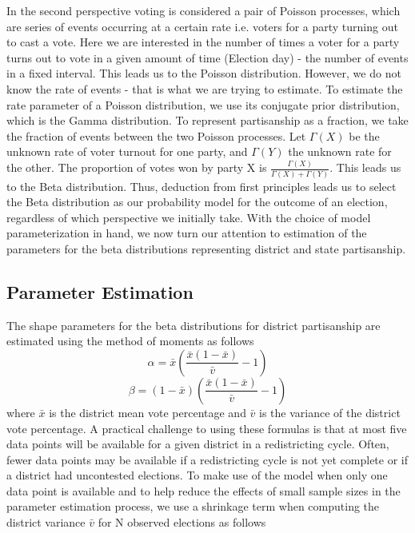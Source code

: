 \documentclass[preprint,12pt]{article}
\begin{document}
In the second perspective voting is considered a pair of Poisson processes, which are series of events occurring at a certain rate i.e. voters for a party turning out to cast a vote. 
Here we are interested in the number of times a voter for a party turns out to vote in a given amount of time (Election day) - the number of events in a fixed interval. 
This leads us to the Poisson distribution.  
However, we do not know the rate of events - that is what we are trying to estimate.  
To estimate the rate parameter of a Poisson distribution, we use its conjugate prior distribution, which is the Gamma distribution. 
To represent partisanship as a fraction, we take the fraction of events between the two Poisson processes.  
Let $\Gamma\left(X\right)$ be the unknown rate of voter turnout for one party, and $\Gamma\left(Y\right)$ the unknown rate for the other.
The proportion of votes won by party X is $\frac{\Gamma\left(X\right)}{\Gamma\left(X\right)+\Gamma\left(Y\right)} $. 
This leads us to the Beta distribution.
Thus, deduction from first principles leads us to select the Beta distribution as our probability model for the outcome of an election, regardless of which perspective we initially take.
With the choice of model parameterization in hand, we now turn our attention to estimation of the parameters for the beta distributions representing district and state partisanship.

\subsection{Parameter Estimation}
The shape parameters for the beta distributions for district partisanship are estimated using the method of moments as follows
\begin{equation}
    \alpha = \bar{x} \left(\frac{\bar{x}\left(1-\bar{x}\right)}{\bar{v}}-1\right)
\end{equation}
\begin{equation}
    \beta = \left(1-\bar{x}\right) \left(\frac{\bar{x}\left(1-\bar{x}\right)}{\bar{v}}-1\right)
\end{equation}
where $\bar{x}$ is the district mean vote percentage and $\bar{v}$ is the variance of the district vote percentage.
A practical challenge to using these formulas is that at most five data points will be available for a given district in a redistricting cycle.
Often, fewer data points may be available if a redistricting cycle is not yet complete or if a district had uncontested elections.
To make use of the model when only one data point is available and to help reduce the effects of small sample sizes in the parameter estimation process, we use a shrinkage term when computing the district variance $\bar{v}$ for N observed elections as follows
\end{document}
